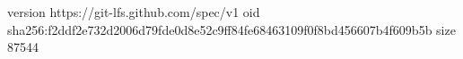 version https://git-lfs.github.com/spec/v1
oid sha256:f2ddf2e732d2006d79fde0d8e52c9ff84fe68463109f0f8bd456607b4f609b5b
size 87544
